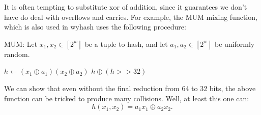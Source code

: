 It is often tempting to substitute xor of addition, since it guarantees we don't have do deal with overflows and carries.
For example, the MUM mixing function, which is also used in wyhash uses the following procedure:
\begin{algorithm}[H]
   \caption{
      MUM:
      Let $x_1,x_2\in [2^w]$ be a tuple to hash, and let $a_1,a_2\in[2^w]$ be uniformly random.
   }
   \begin{algorithmic}
      \State $h\gets (x_1 \oplus a_1)(x_2 \oplus a_2)$
      \State \Return $h \oplus (h >> 32)$
   \end{algorithmic}
\end{algorithm}
We can show that even without the final reduction from 64 to 32 bits, the above function can be tricked to produce many collisions.
Well, at least this one can:
\[
   h(x_1, x_2) = a_1 x_1 \oplus a_2 x_2.
\]
